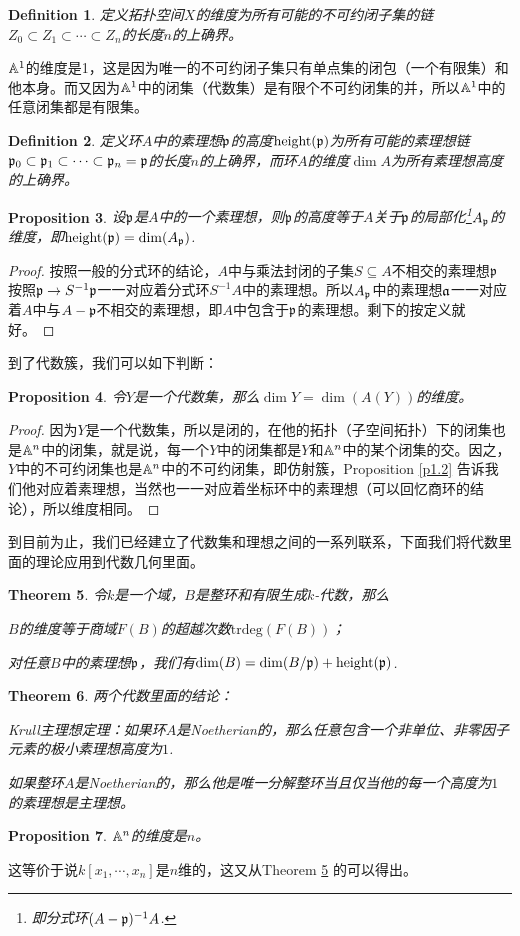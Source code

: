 \documentclass[9pt]{extarticle}
\theoremstyle{plain}%
\newtheorem{defi}{Definition}[section]%
\newtheorem{pro}[defi]{Proposition}%
\newtheorem{theo}[defi]{Theorem}%
\begin{document}
\begin{defi}
	定义拓扑空间$X$的维度为所有可能的不可约闭子集的链$Z_0\subset Z_1\subset \cdots \subset Z_n$的长度$n$的上确界。
\end{defi}

$\mathbb{A}^1$的维度是1，这是因为唯一的不可约闭子集只有单点集的闭包（一个有限集）和他本身。而又因为$\mathbb{A}^1$中的闭集（代数集）是有限个不可约闭集的并，所以$\mathbb{A}^1$中的任意闭集都是有限集。

\begin{defi}
定义环$A$中的素理想$\mathfrak{p}$的高度$\operatorname{height}(\mathfrak{p})$为所有可能的素理想链$\mathfrak{p}_0\subset \mathfrak{p}_1\subset \cdots \subset \mathfrak{p}_n=\mathfrak{p}$的长度$n$的上确界，而环$A$的维度$\dim A$为所有素理想高度的上确界。
\end{defi}
\begin{pro}
设$\mathfrak{p}$是$A$中的一个素理想，则$\mathfrak{p}$的高度等于$A$关于$\mathfrak{p}$的局部化\footnote{即分式环$(A-\mathfrak{p})^{-1}A$.}$A_{\mathfrak{p}}$的维度，即$\operatorname{height}(\mathfrak{p})=\dim (A_{\mathfrak{p}})$.
\end{pro}
\begin{proof}
按照一般的分式环的结论，$A$中与乘法封闭的子集$S\subseteq A$不相交的素理想$\mathfrak{p}$按照$\mathfrak{p} \to S^{-1}\mathfrak{p}$一一对应着分式环$S^{-1}A$中的素理想。所以$A_{\mathfrak{p}}$中的素理想$\mathfrak{a}$一一对应着$A$中与$A-\mathfrak{p}$不相交的素理想，即$A$中包含于$\mathfrak{p}$的素理想。剩下的按定义就好。
\end{proof}

到了代数簇，我们可以如下判断：

\begin{pro}令$Y$是一个代数集，那么$\dim Y=\dim (A(Y))$的维度。\end{pro}

\begin{proof}
因为$Y$是一个代数集，所以是闭的，在他的拓扑（子空间拓扑）下的闭集也是$\mathbb{A}^n$中的闭集，就是说，每一个$Y$中的闭集都是$Y$和$\mathbb{A}^n$中的某个闭集的交。因之，$Y$中的不可约闭集也是$\mathbb{A}^n$中的不可约闭集，即仿射簇，Proposition \ref{p1.2} 告诉我们他对应着素理想，当然也一一对应着坐标环中的素理想（可以回忆商环的结论），所以维度相同。
\end{proof}
到目前为止，我们已经建立了代数集和理想之间的一系列联系，下面我们将代数里面的理论应用到代数几何里面。

\begin{theo}
令$k$是一个域，$B$是整环和有限生成$k$-代数，那么

 $B$的维度等于商域$F(B)$的超越次数$\mathrm{trdeg}(F(B))$；

 对任意$B$中的素理想$\mathfrak{p}$，我们有$\dim (B)=\dim (B/\mathfrak{p}) +\operatorname{height}(\mathfrak{p}) $.
\label{t1.2}
\end{theo}
\begin{theo}两个代数里面的结论：

Krull主理想定理：如果环$A$是Noetherian的，那么任意包含一个非单位、非零因子元素的极小素理想高度为$1$.

如果整环$A$是Noetherian的，那么他是唯一分解整环当且仅当他的每一个高度为$1$的素理想是主理想。
\end{theo}
\begin{pro}
$\mathbb{A}^n$的维度是$n$。
\end{pro}
这等价于说$k[x_1,\cdots, x_n]$是$n$维的，这又从Theorem \ref{t1.2} 的可以得出。
\end{document}
